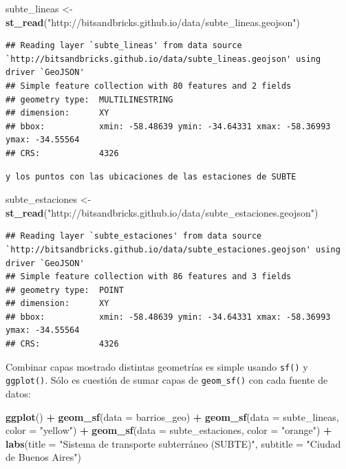 \documentclass[spanish,]{book}
\newenvironment{Shaded}{\begin{snugshade}}{\end{snugshade}}
\newcommand{\DataTypeTok}[1]{\textcolor[rgb]{0.13,0.29,0.53}{#1}}
\newcommand{\KeywordTok}[1]{\textcolor[rgb]{0.13,0.29,0.53}{\textbf{#1}}}
\newcommand{\NormalTok}[1]{#1}
\newcommand{\OperatorTok}[1]{\textcolor[rgb]{0.81,0.36,0.00}{\textbf{#1}}}
\newcommand{\StringTok}[1]{\textcolor[rgb]{0.31,0.60,0.02}{#1}}
\begin{document}
\begin{Shaded}
\begin{Highlighting}[]
\NormalTok{subte_lineas <-}\StringTok{ }\KeywordTok{st_read}\NormalTok{(}\StringTok{"http://bitsandbricks.github.io/data/subte_lineas.geojson"}\NormalTok{)}
\end{Highlighting}
\end{Shaded}

\begin{verbatim}
## Reading layer `subte_lineas' from data source `http://bitsandbricks.github.io/data/subte_lineas.geojson' using driver `GeoJSON'
## Simple feature collection with 80 features and 2 fields
## geometry type:  MULTILINESTRING
## dimension:      XY
## bbox:           xmin: -58.48639 ymin: -34.64331 xmax: -58.36993 ymax: -34.55564
## CRS:            4326
\end{verbatim}

\begin{verbatim}
y los puntos con las ubicaciones de las estaciones de SUBTE
\end{verbatim}

\begin{Shaded}
\begin{Highlighting}[]
\NormalTok{subte_estaciones <-}\StringTok{ }\KeywordTok{st_read}\NormalTok{(}\StringTok{"http://bitsandbricks.github.io/data/subte_estaciones.geojson"}\NormalTok{)}
\end{Highlighting}
\end{Shaded}

\begin{verbatim}
## Reading layer `subte_estaciones' from data source `http://bitsandbricks.github.io/data/subte_estaciones.geojson' using driver `GeoJSON'
## Simple feature collection with 86 features and 3 fields
## geometry type:  POINT
## dimension:      XY
## bbox:           xmin: -58.48639 ymin: -34.64331 xmax: -58.36993 ymax: -34.55564
## CRS:            4326
\end{verbatim}

Combinar capas mostrado distintas geometrías es simple usando \texttt{sf()} y \texttt{ggplot()}. Sólo es cuestión de sumar capas de \texttt{geom\_sf()} con cada fuente de datos:

\begin{Shaded}
\begin{Highlighting}[]
\KeywordTok{ggplot}\NormalTok{() }\OperatorTok{+}
\StringTok{    }\KeywordTok{geom_sf}\NormalTok{(}\DataTypeTok{data =}\NormalTok{ barrios_geo) }\OperatorTok{+}
\StringTok{    }\KeywordTok{geom_sf}\NormalTok{(}\DataTypeTok{data =}\NormalTok{ subte_lineas, }\DataTypeTok{color =} \StringTok{"yellow"}\NormalTok{) }\OperatorTok{+}
\StringTok{    }\KeywordTok{geom_sf}\NormalTok{(}\DataTypeTok{data =}\NormalTok{ subte_estaciones, }\DataTypeTok{color =} \StringTok{"orange"}\NormalTok{) }\OperatorTok{+}
\StringTok{    }\KeywordTok{labs}\NormalTok{(}\DataTypeTok{title =} \StringTok{"Sistema de transporte subterráneo (SUBTE)"}\NormalTok{,}
         \DataTypeTok{subtitle =} \StringTok{"Ciudad de Buenos Aires"}\NormalTok{)}
\end{Highlighting}
\end{Shaded}
\end{document}
